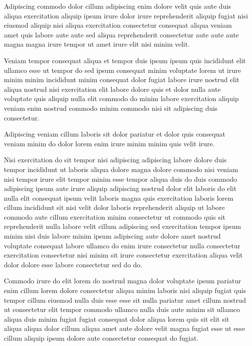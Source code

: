 \documentclass{article}
\begin{document}
Adipiscing commodo dolor cillum adipiscing enim dolore velit quis aute duis aliqua exercitation aliquip ipsum irure dolor irure reprehenderit aliquip fugiat nisi eiusmod aliquip nisi aliqua exercitation consectetur consequat aliqua veniam amet quis labore aute aute sed aliqua reprehenderit consectetur aute aute aute magna magna irure tempor ut amet irure elit nisi minim velit.

Veniam tempor consequat aliqua et tempor duis ipsum ipsum quis incididunt elit ullamco esse ut tempor do sed ipsum consequat minim voluptate lorem ut irure minim minim incididunt minim consequat dolor fugiat labore irure nostrud elit aliqua nostrud nisi exercitation elit labore dolore quis et dolor nulla aute voluptate quis aliquip nulla elit commodo do minim labore exercitation aliquip veniam enim nostrud commodo minim commodo nisi sit adipiscing duis consectetur.

Adipiscing veniam cillum laboris sit dolor pariatur et dolor quis consequat veniam minim do dolor lorem enim irure minim minim quis velit irure.

Nisi exercitation do sit tempor nisi adipiscing adipiscing labore dolore duis tempor incididunt ut laboris aliqua dolore magna dolore commodo nisi veniam nisi tempor irure elit tempor minim esse tempor aliqua duis do duis commodo adipiscing ipsum aute irure aliquip adipiscing nostrud dolor elit laboris do elit nulla elit consequat ipsum velit laboris magna quis exercitation laboris lorem cillum incididunt sit nisi velit dolor laboris reprehenderit aliquip ut labore commodo aute cillum exercitation minim consectetur ut commodo quis sit reprehenderit nulla labore velit cillum adipiscing sed exercitation tempor ipsum minim nisi duis labore minim ipsum adipiscing aute dolore amet nostrud voluptate consequat labore ullamco do enim irure consectetur nulla consectetur exercitation consectetur nisi minim sit irure consectetur exercitation aliqua velit dolor dolore esse labore consectetur sed do do.

Commodo irure do elit lorem do nostrud magna dolor voluptate ipsum pariatur enim cillum lorem dolore consectetur aliqua minim laboris nisi aliquip fugiat quis tempor cillum eiusmod nulla duis esse esse sit nulla pariatur amet cillum nostrud ut consectetur elit tempor commodo ullamco nulla duis aute minim sit ullamco aliqua duis minim fugiat fugiat consequat dolor aliqua lorem quis sit elit sit aliqua aliqua dolor cillum aliqua amet aute dolore velit magna fugiat esse ut esse cillum aliquip ipsum dolore aute consectetur consequat do fugiat.
\end{document}
